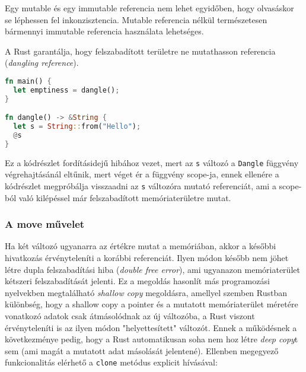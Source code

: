 Egy mutable és egy immutable referencia nem lehet egyidőben, hogy olvasáskor se léphessen fel inkonzisztencia. Mutable referencia nélkül természetesen bármennyi immutable referencia használata lehetséges.

A Rust garantálja, hogy felszabadított területre ne mutathasson referencia (\textit{dangling reference}).
\begin{lstlisting}[language=Rust, style=boxed]
fn main() {
  let emptiness = dangle();
}

fn dangle() -> &String {
  let s = String::from("Hello");
  @s
}
\end{lstlisting}
Ez a kódrészlet fordításidejű hibához vezet, mert az \lstinline{s} változó a \lstinline{Dangle} függvény végrehajtásánál eltűnik, mert véget ér a függvény scope-ja, ennek ellenére a kódrészlet megpróbálja visszaadni az \lstinline{s} változóra mutató referenciát, ami a scope-ból való kilépéssel már felszabadított memóriaterületre mutat.

\subsubsection{A move művelet}

Ha két változó ugyanarra az értékre mutat a memóriában, akkor a későbbi hivatkozás érvényteleníti a korábbi referenciát. Ilyen módon később nem jöhet létre dupla felszabadítási hiba (\textit{double free error}), ami ugyanazon memóriaterület kétszeri felszabadítását jelenti. Ez a megoldás hasonlít más programozási nyelvekben megtalálható \textit{shallow copy} megoldásra, amellyel szemben Rustban különbség, hogy a shallow copy a pointer és a mutatott memóriaterület méretére vonatkozó adatok csak átmásolódnak az új változóba, a Rust viszont érvényteleníti is az ilyen módon "helyettesített" változót. Ennek a működésnek a következménye pedig, hogy a Rust automatikusan soha nem hoz létre \textit{deep copy}t sem (ami magát a mutatott adat másolását jelentené). Ellenben megegyező funkcionalitás elérhető a \lstinline{clone} metódus explicit hívásával:

\begin{lstlisting}[language=Rust, style=boxed]

\end{lstlisting}


